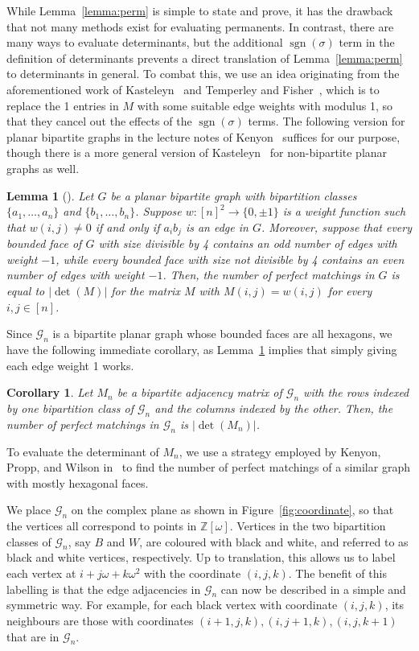 \documentclass{article}
\DeclareMathOperator\sgn{sgn}
\newtheorem{lemma}[theorem]{Lemma}
\newtheorem{corollary}[theorem]{Corollary}
\begin{document}
While Lemma~\ref{lemma:perm} is simple to state and prove, it has the drawback that not many methods exist for evaluating permanents. In contrast, there are many ways to evaluate determinants, but the additional $\sgn(\sigma)$ term in the definition of determinants prevents a direct translation of Lemma~\ref{lemma:perm} to determinants in general. To combat this, we use an idea originating from the aforementioned work of Kasteleyn~\cite{K} and Temperley and Fisher~\cite{TF}, which is to replace the 1 entries in $M$ with some suitable edge weights with modulus 1, so that they cancel out the effects of the $\sgn(\sigma)$ terms. The following version for planar bipartite graphs in the lecture notes of Kenyon~\cite{Ken} suffices for our purpose, though there is a more general version of Kasteleyn~\cite{K2} for non-bipartite planar graphs as well.
\begin{lemma}[{\cite[Theorem 2]{Ken}}]\label{lemma:weight}
Let $G$ be a planar bipartite graph with bipartition classes $\{a_1,\ldots,a_n\}$ and $\{b_1,\ldots,b_n\}$. Suppose $w:[n]^2\to\{0,\pm1\}$ is a weight function such that $w(i,j)\not=0$ if and only if $a_ib_j$ is an edge in $G$. Moreover, suppose that every bounded face of $G$ with size divisible by 4 contains an odd number of edges with weight $-1$, while every bounded face with size not divisible by 4 contains an even number of edges with weight $-1$. Then, the number of perfect matchings in $G$ is equal to $|\det(M)|$ for the matrix $M$ with $M(i,j)=w(i,j)$ for every $i,j\in[n]$.
\end{lemma}

Since $\mathcal{G}_n$ is a bipartite planar graph whose bounded faces are all hexagons, we have the following immediate corollary, as Lemma~\ref{lemma:weight} implies that simply giving each edge weight 1 works. 
\begin{corollary}\label{cor:det=}
Let $M_n$ be a bipartite adjacency matrix of $\mathcal{G}_n$ with the rows indexed by one bipartition class of $\mathcal{G}_n$ and the columns indexed by the other. Then, the number of perfect matchings in $\mathcal{G}_n$ is $|\det(M_n)|$.
\end{corollary}

To evaluate the determinant of $M_n$, we use a strategy employed by Kenyon, Propp, and Wilson in~{\cite[Section 6.9]{KPW}} to find the number of perfect matchings of a similar graph with mostly hexagonal faces.

We place $\mathcal{G}_n$ on the complex plane as shown in Figure~\ref{fig:coordinate}, so that the vertices all correspond to points in $\mathbb{Z}[\omega]$. Vertices in the two bipartition classes of $\mathcal{G}_n$, say $B$ and $W$, are coloured with black and white, and referred to as black and white vertices, respectively. Up to translation, this allows us to label each vertex at $i+j\omega+k\omega^2$ with the coordinate $(i,j,k)$. The benefit of this labelling is that the edge adjacencies in $\mathcal{G}_n$ can now be described in a simple and symmetric way. For example, for each black vertex with coordinate $(i,j,k)$, its neighbours are those with coordinates $(i+1,j,k), (i,j+1,k), (i,j,k+1)$ that are in $\mathcal{G}_n$. 
\end{document}
